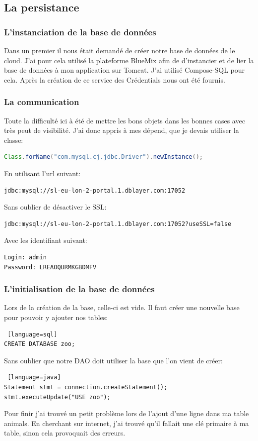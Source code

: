 \documentclass{article}
\begin{document}
\subsection{La persistance}
\subsubsection{L'instanciation  de la base de données}
Dans un premier il nous était demandé de créer notre base de données de le cloud. J'ai pour cela utilisé la plateforme BlueMix afin de d'instancier et de lier la base de données à mon application sur Tomcat. J'ai utilisé Compose-SQL pour cela. Après la création de ce service des Crédentials nous ont été fournis.
\subsubsection{La communication}
Toute la difficulté ici à été de mettre les bons objets dans les bonnes cases avec très peut de visibilité. J'ai donc appris à mes dépend, que je devais utiliser la classe:
\begin{lstlisting}[language=java]
Class.forName("com.mysql.cj.jdbc.Driver").newInstance();
\end{lstlisting}
En utilisant l'url suivant:
\begin{lstlisting}
jdbc:mysql://sl-eu-lon-2-portal.1.dblayer.com:17052
\end{lstlisting}
Sans oublier de désactiver le SSL:
\begin{lstlisting}
jdbc:mysql://sl-eu-lon-2-portal.1.dblayer.com:17052?useSSL=false
\end{lstlisting}
Avec les identifiant suivant:
\begin{lstlisting}
Login: admin
Password: LREAOQURMKGBDMFV
\end{lstlisting}
\subsubsection{L'initialisation de la base de données}
Lors de la création de la base, celle-ci est vide. Il faut créer une nouvelle base pour pouvoir y ajouter nos tables:
\begin{lstlisting} [language=sql]
CREATE DATABASE zoo;
\end{lstlisting}
Sans oublier que notre DAO doit utiliser la base que l'on vient de créer:
\begin{lstlisting} [language=java]
Statement stmt = connection.createStatement();
stmt.executeUpdate("USE zoo");
\end{lstlisting}
Pour finir j'ai trouvé un petit problème lors de l'ajout d'une ligne dans ma table animals. En cherchant sur internet, j'ai trouvé qu'il fallait une clé primaire à ma table, sinon cela provoquait des erreurs.
\end{document}
